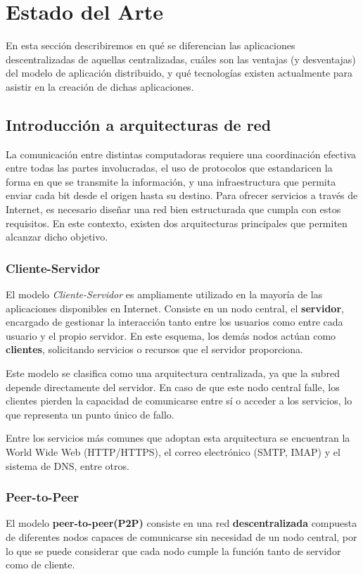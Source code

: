 \section{Estado del Arte}
En esta sección describiremos en qué se diferencian las aplicaciones descentralizadas de aquellas centralizadas, cuáles son las ventajas (y desventajas) del modelo de aplicación distribuido, y qué tecnologías existen actualmente para asistir en la creación de dichas aplicaciones.

\subsection{Introducción a arquitecturas de red}
La comunicación entre distintas computadoras requiere una coordinación efectiva entre todas las partes involucradas, el uso de protocolos que estandaricen la forma en que se transmite la información, y una infraestructura que permita enviar cada bit desde el origen hasta su destino. Para ofrecer servicios a través de Internet, es necesario diseñar una red bien estructurada que cumpla con estos requisitos. En este contexto, existen dos arquitecturas principales que permiten alcanzar dicho objetivo.

\subsubsection*{Cliente-Servidor}

El modelo \textit{Cliente-Servidor} es ampliamente utilizado en la mayoría de las aplicaciones disponibles en Internet. Consiste en un nodo central, el \textbf{servidor}, encargado de gestionar la interacción tanto entre los usuarios como entre cada usuario y el propio servidor. En este esquema, los demás nodos actúan como \textbf{clientes}, solicitando servicios o recursos que el servidor proporciona.

Este modelo se clasifica como una arquitectura centralizada, ya que la subred depende directamente del servidor. En caso de que este nodo central falle, los clientes pierden la capacidad de comunicarse entre sí o acceder a los servicios, lo que representa un punto único de fallo.

Entre los servicios más comunes que adoptan esta arquitectura se encuentran la World Wide Web (HTTP/HTTPS), el correo electrónico (SMTP, IMAP) y el sistema de DNS, entre otros.

\subsubsection*{Peer-to-Peer}
El modelo \textbf{peer-to-peer(P2P)} consiste en una red \textbf{descentralizada} compuesta de diferentes nodos capaces de comunicarse sin necesidad de un nodo central, por lo que se puede considerar que cada nodo cumple la función tanto de servidor como de cliente.

